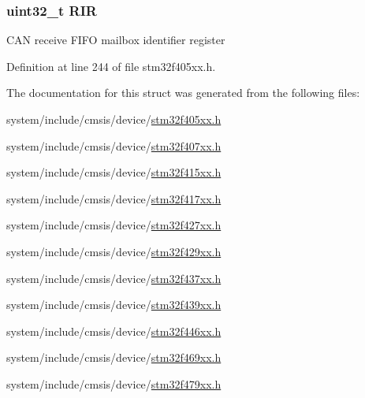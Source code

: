 \subsubsection[{\texorpdfstring{R\+IR}{RIR}}]{ uint32\+\_\+t R\+IR}\hypertarget{struct_c_a_n___f_i_f_o_mail_box___type_def_a0acc8eb90b17bef5b9e03c7ddaacfb0b}{}\label{struct_c_a_n___f_i_f_o_mail_box___type_def_a0acc8eb90b17bef5b9e03c7ddaacfb0b}
C\+AN receive F\+I\+FO mailbox identifier register 

Definition at line 244 of file stm32f405xx.\+h.



The documentation for this struct was generated from the following files\+:\begin{DoxyCompactItemize}
\item 
system/include/cmsis/device/\hyperlink{stm32f405xx_8h}{stm32f405xx.\+h}\item 
system/include/cmsis/device/\hyperlink{stm32f407xx_8h}{stm32f407xx.\+h}\item 
system/include/cmsis/device/\hyperlink{stm32f415xx_8h}{stm32f415xx.\+h}\item 
system/include/cmsis/device/\hyperlink{stm32f417xx_8h}{stm32f417xx.\+h}\item 
system/include/cmsis/device/\hyperlink{stm32f427xx_8h}{stm32f427xx.\+h}\item 
system/include/cmsis/device/\hyperlink{stm32f429xx_8h}{stm32f429xx.\+h}\item 
system/include/cmsis/device/\hyperlink{stm32f437xx_8h}{stm32f437xx.\+h}\item 
system/include/cmsis/device/\hyperlink{stm32f439xx_8h}{stm32f439xx.\+h}\item 
system/include/cmsis/device/\hyperlink{stm32f446xx_8h}{stm32f446xx.\+h}\item 
system/include/cmsis/device/\hyperlink{stm32f469xx_8h}{stm32f469xx.\+h}\item 
system/include/cmsis/device/\hyperlink{stm32f479xx_8h}{stm32f479xx.\+h}\end{DoxyCompactItemize}
